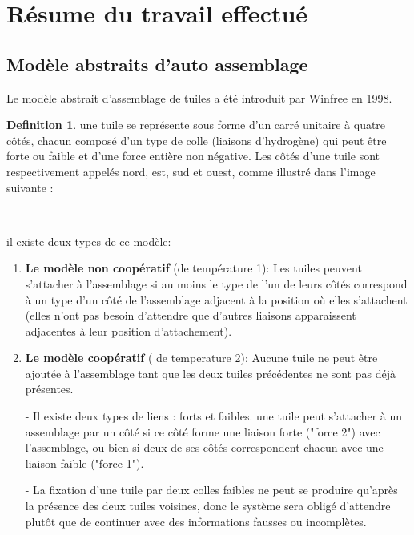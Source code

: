 \documentclass[12pt]{article}
\theoremstyle{definition}
\newtheorem{definition}{Definition}
\begin{document}
	\section{Résume du travail effectué}
	\subsection{Modèle abstraits d'auto assemblage}
	Le modèle abstrait d'assemblage de tuiles a été introduit par Winfree en 1998.
	\begin{definition}
		une tuile se représente sous forme d'un carré unitaire à quatre côtés, chacun composé d'un type de colle (liaisons d'hydrogène) qui peut être forte ou faible et d'une force entière non négative. Les côtés d'une tuile sont respectivement appelés nord, est, sud et ouest, comme illustré dans l'image suivante : \\
		\begin{center}
			\\
		\end{center} 
	\end{definition} 
	
	il existe deux types de ce modèle: 
	\begin{enumerate}
		\item \textbf{Le modèle non coopératif} (de température 1): Les tuiles peuvent s'attacher à l'assemblage si au moins le type de l'un de leurs côtés correspond à un type d'un côté de l'assemblage adjacent à la position où elles s'attachent (elles n'ont pas besoin d'attendre que d'autres liaisons apparaissent adjacentes à leur position d'attachement).\\
		
		\item \textbf{Le modèle coopératif} ( de temperature 2): Aucune tuile ne peut être ajoutée à l'assemblage tant que les deux tuiles précédentes ne sont pas déjà présentes.
		
		- Il existe deux types de liens : forts et faibles. une tuile peut s'attacher à un assemblage par un côté si ce côté forme une liaison forte ("force 2") avec l'assemblage, ou bien si deux de ses côtés correspondent chacun avec une liaison faible ("force 1").
		
		- La fixation d'une tuile par deux colles faibles ne peut se produire qu'après la présence des deux tuiles voisines, donc le système sera obligé d'attendre plutôt que de continuer avec des informations fausses ou incomplètes.\\
	\end{enumerate}
	
\end{document}
